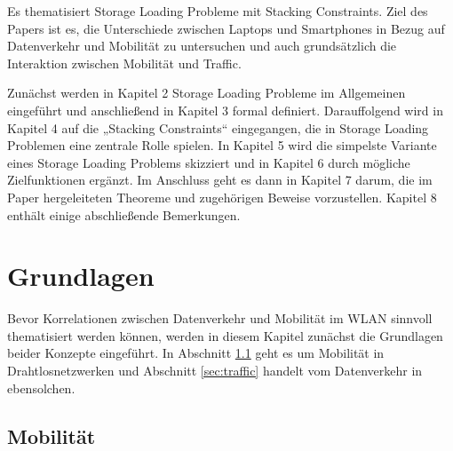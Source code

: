 \documentclass[12pt, a4paper]{article}
\begin{document}
Es thematisiert Storage Loading Probleme mit Stacking Constraints.
\newline\newline
Ziel des Papers ist es, die Unterschiede zwischen Laptops und Smartphones in Bezug auf Datenverkehr und Mobilität
zu untersuchen und auch grundsätzlich die Interaktion zwischen Mobilität und Traffic.

Zunächst werden in Kapitel 2 Storage Loading Probleme im Allgemeinen eingeführt
und anschließend in Kapitel 3 formal definiert. Darauffolgend wird in Kapitel 4 auf die
„Stacking Constraints“ eingegangen, die in Storage Loading Problemen eine zentrale
Rolle spielen. In Kapitel 5 wird die simpelste Variante eines Storage Loading Problems
skizziert und in Kapitel 6 durch mögliche Zielfunktionen ergänzt. Im Anschluss geht
es dann in Kapitel 7 darum, die im Paper hergeleiteten Theoreme und zugehörigen
Beweise vorzustellen. Kapitel 8 enthält einige abschließende Bemerkungen.

\pagebreak


\section{Grundlagen}

Bevor Korrelationen zwischen Datenverkehr und Mobilität im WLAN sinnvoll thematisiert werden können, 
werden in diesem Kapitel zunächst die Grundlagen beider Konzepte eingeführt.
In Abschnitt \ref{sec:mobility} geht es um Mobilität in Drahtlosnetzwerken und Abschnitt \ref{sec:traffic} handelt
vom Datenverkehr in ebensolchen.

\subsection{Mobilität}
\label{sec:mobility}
\end{document}
